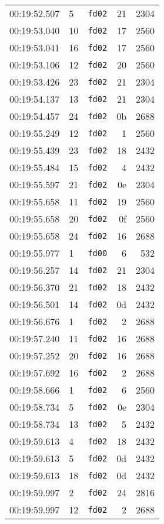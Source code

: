 \documentclass{article}
\begin{document}
\begin{longtable}{lllrr}
00:19:52.507 & 5 & \texttt{fd02} & 21 & 2304 \\
00:19:53.040 & 10 & \texttt{fd02} & 17 & 2560 \\
00:19:53.041 & 16 & \texttt{fd02} & 17 & 2560 \\
00:19:53.106 & 12 & \texttt{fd02} & 20 & 2560 \\
00:19:53.426 & 23 & \texttt{fd02} & 21 & 2304 \\
00:19:54.137 & 13 & \texttt{fd02} & 21 & 2304 \\
00:19:54.457 & 24 & \texttt{fd02} & 0b & 2688 \\
00:19:55.249 & 12 & \texttt{fd02} & 1 & 2560 \\
00:19:55.439 & 23 & \texttt{fd02} & 18 & 2432 \\
00:19:55.484 & 15 & \texttt{fd02} & 4 & 2432 \\
00:19:55.597 & 21 & \texttt{fd02} & 0e & 2304 \\
00:19:55.658 & 11 & \texttt{fd02} & 19 & 2560 \\
00:19:55.658 & 20 & \texttt{fd02} & 0f & 2560 \\
00:19:55.658 & 24 & \texttt{fd02} & 16 & 2688 \\
00:19:55.977 & 1 & \texttt{fd00} & 6 & 532 \\
00:19:56.257 & 14 & \texttt{fd02} & 21 & 2304 \\
00:19:56.370 & 21 & \texttt{fd02} & 18 & 2432 \\
00:19:56.501 & 14 & \texttt{fd02} & 0d & 2432 \\
00:19:56.676 & 1 & \texttt{fd02} & 2 & 2688 \\
00:19:57.240 & 11 & \texttt{fd02} & 16 & 2688 \\
00:19:57.252 & 20 & \texttt{fd02} & 16 & 2688 \\
00:19:57.692 & 16 & \texttt{fd02} & 2 & 2688 \\
00:19:58.666 & 1 & \texttt{fd02} & 6 & 2560 \\
00:19:58.734 & 5 & \texttt{fd02} & 0e & 2304 \\
00:19:58.734 & 13 & \texttt{fd02} & 5 & 2432 \\
00:19:59.613 & 4 & \texttt{fd02} & 18 & 2432 \\
00:19:59.613 & 5 & \texttt{fd02} & 0d & 2432 \\
00:19:59.613 & 18 & \texttt{fd02} & 0d & 2432 \\
00:19:59.997 & 2 & \texttt{fd02} & 24 & 2816 \\
00:19:59.997 & 12 & \texttt{fd02} & 2 & 2688 \\
\end{longtable}
\end{document}
